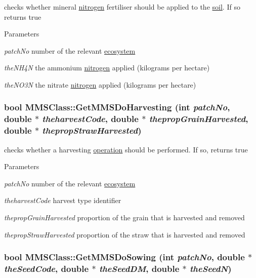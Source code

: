 checks whether mineral \hyperlink{classnitrogen}{nitrogen} fertiliser should be applied to the \hyperlink{classsoil}{soil}. If so returns true 
\begin{DoxyParams}{Parameters}
\item[{\em patchNo}]number of the relevant \hyperlink{classecosystem}{ecosystem} \item[{\em theNH4N}]the ammonium \hyperlink{classnitrogen}{nitrogen} applied (kilograms per hectare) \item[{\em theNO3N}]the nitrate \hyperlink{classnitrogen}{nitrogen} applied (kilograms per hectare) \end{DoxyParams}
\hypertarget{class_m_m_s_class_aa95d9e26d6a4ea7fc754aecd19d8a2bb}{
\subsubsection[{GetMMSDoHarvesting}]{\setlength{\rightskip}{0pt plus 5cm}bool MMSClass::GetMMSDoHarvesting (int {\em patchNo}, \/  double $\ast$ {\em theharvestCode}, \/  double $\ast$ {\em thepropGrainHarvested}, \/  double $\ast$ {\em thepropStrawHarvested})}}
\label{class_m_m_s_class_aa95d9e26d6a4ea7fc754aecd19d8a2bb}


checks whether a harvesting \hyperlink{classoperation}{operation} should be performed. If so, returns true 
\begin{DoxyParams}{Parameters}
\item[{\em patchNo}]number of the relevant \hyperlink{classecosystem}{ecosystem} \item[{\em theharvestCode}]harvest type identifier \item[{\em thepropGrainHarvested}]proportion of the grain that is harvested and removed \item[{\em thepropStrawHarvested}]proportion of the straw that is harvested and removed \end{DoxyParams}
\hypertarget{class_m_m_s_class_aa525cef9cc6ca7af74abed81f5bcf40e}{
\subsubsection[{GetMMSDoSowing}]{\setlength{\rightskip}{0pt plus 5cm}bool MMSClass::GetMMSDoSowing (int {\em patchNo}, \/  double $\ast$ {\em theSeedCode}, \/  double $\ast$ {\em theSeedDM}, \/  double $\ast$ {\em theSeedN})}}
\label{class_m_m_s_class_aa525cef9cc6ca7af74abed81f5bcf40e}


